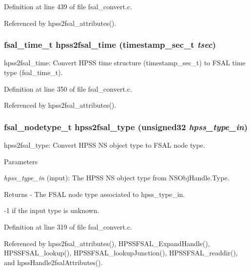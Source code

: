 Definition at line 439 of file fsal\_\-convert.c.

Referenced by hpss2fsal\_\-attributes().
\subsubsection[{hpss2fsal\_\-time}]{\setlength{\rightskip}{0pt plus 5cm}fsal\_\-time\_\-t hpss2fsal\_\-time (timestamp\_\-sec\_\-t {\em tsec})}\label{fsal__convert_8c_a300abfc1218fa0f2814a0d6ab513a71c}
hpss2fsal\_\-time: Convert HPSS time structure (timestamp\_\-sec\_\-t) to FSAL time type (fsal\_\-time\_\-t). 

Definition at line 350 of file fsal\_\-convert.c.

Referenced by hpss2fsal\_\-attributes().
\subsubsection[{hpss2fsal\_\-type}]{\setlength{\rightskip}{0pt plus 5cm}fsal\_\-nodetype\_\-t hpss2fsal\_\-type (unsigned32 {\em hpss\_\-type\_\-in})}\label{fsal__convert_8c_a111704e087414214b69f8876316c5ca9}
hpss2fsal\_\-type: Convert HPSS NS object type to FSAL node type.


\begin{DoxyParams}{Parameters}
\item[{\em hpss\_\-type\_\-in}](input): The HPSS NS object type from NSObjHandle.Type.\end{DoxyParams}
\begin{DoxyReturn}{Returns}
-\/ The FSAL node type associated to hpss\_\-type\_\-in.
\begin{DoxyItemize}
\item -\/1 if the input type is unknown. 
\end{DoxyItemize}
\end{DoxyReturn}


Definition at line 319 of file fsal\_\-convert.c.

Referenced by hpss2fsal\_\-attributes(), HPSSFSAL\_\-ExpandHandle(), HPSSFSAL\_\-lookup(), HPSSFSAL\_\-lookupJunction(), HPSSFSAL\_\-readdir(), and hpssHandle2fsalAttributes().
